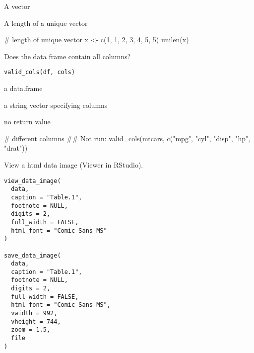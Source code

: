 \documentclass[letterpaper]{book}
\begin{document}
%
\begin{Arguments}
\begin{ldescription}
\item[\code{x}] A vector
\end{ldescription}
\end{Arguments}
%
\begin{Value}
A length of a unique vector
\end{Value}
%
\begin{Examples}
\begin{ExampleCode}
# length of unique vector
x <- c(1, 1, 2, 3, 4, 5, 5)
unilen(x)

\end{ExampleCode}
\end{Examples}
%
\begin{Description}
Does the data frame contain all columns?
\end{Description}
%
\begin{Usage}
\begin{verbatim}
valid_cols(df, cols)
\end{verbatim}
\end{Usage}
%
\begin{Arguments}
\begin{ldescription}
\item[\code{df}] a data.frame

\item[\code{cols}] a string vector specifying columns
\end{ldescription}
\end{Arguments}
%
\begin{Value}
no return value
\end{Value}
%
\begin{Examples}
\begin{ExampleCode}
# different columns
## Not run: valid_cols(mtcars, c("mpg", "cyl", "disp", "hp", "drat"))

\end{ExampleCode}
\end{Examples}
%
\begin{Description}
View a html data image (Viewer in RStudio).
\end{Description}
%
\begin{Usage}
\begin{verbatim}
view_data_image(
  data,
  caption = "Table.1",
  footnote = NULL,
  digits = 2,
  full_width = FALSE,
  html_font = "Comic Sans MS"
)

save_data_image(
  data,
  caption = "Table.1",
  footnote = NULL,
  digits = 2,
  full_width = FALSE,
  html_font = "Comic Sans MS",
  vwidth = 992,
  vheight = 744,
  zoom = 1.5,
  file
)
\end{verbatim}
\end{Usage}
\end{document}
